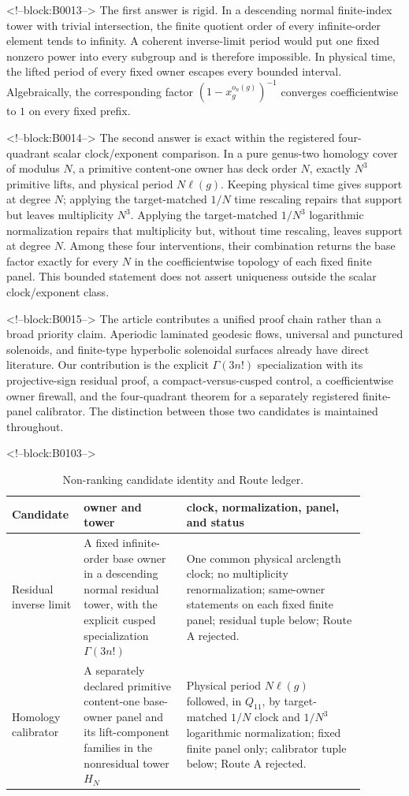 \documentclass[11pt]{article}
\theoremstyle{definition}
\theoremstyle{remark}
\begin{document}
<!--block:B0013-->
The first answer is rigid. In a descending normal finite-index tower with trivial intersection, the finite quotient order of every infinite-order element tends to infinity. A coherent inverse-limit period would put one fixed nonzero power into every subgroup and is therefore impossible. In physical time, the lifted period of every fixed owner escapes every bounded interval. Algebraically, the corresponding factor $(1-x_g^{o_n(g)})^{-1}$ converges coefficientwise to $1$ on every fixed prefix.

<!--block:B0014-->
The second answer is exact within the registered four-quadrant scalar clock/exponent comparison. In a pure genus-two homology cover of modulus $N$, a primitive content-one owner has deck order $N$, exactly $N^3$ primitive lifts, and physical period $N\ell(g)$. Keeping physical time gives support at degree $N$; applying the target-matched $1/N$ time rescaling repairs that support but leaves multiplicity $N^3$. Applying the target-matched $1/N^3$ logarithmic normalization repairs that multiplicity but, without time rescaling, leaves support at degree $N$. Among these four interventions, their combination returns the base factor exactly for every $N$ in the coefficientwise topology of each fixed finite panel. This bounded statement does not assert uniqueness outside the scalar clock/exponent class.

<!--block:B0015-->
The article contributes a unified proof chain rather than a broad priority claim. Aperiodic laminated geodesic flows, universal and punctured solenoids, and finite-type hyperbolic solenoidal surfaces already have direct literature. Our contribution is the explicit $\Gamma(3n!)$ specialization with its projective-sign residual proof, a compact-versus-cusped control, a coefficientwise owner firewall, and the four-quadrant theorem for a separately registered finite-panel calibrator. The distinction between those two candidates is maintained throughout.

<!--block:B0103-->
\begin{table}[ht]
\centering
\small
\caption{Non-ranking candidate identity and Route ledger.}
\label{tab:candidate-route-map}
\begin{tabular}{p{0.15\linewidth}p{0.27\linewidth}p{0.47\linewidth}}
\toprule
Candidate & owner and tower & clock, normalization, panel, and status \\
\midrule
Residual inverse limit & A fixed infinite-order base owner in a descending normal residual tower, with the explicit cusped specialization $\Gamma(3n!)$ & One common physical arclength clock; no multiplicity renormalization; same-owner statements on each fixed finite panel; residual tuple below; Route A rejected. \\
Homology calibrator & A separately declared primitive content-one base-owner panel and its lift-component families in the nonresidual tower $H_N$ & Physical period $N\ell(g)$ followed, in $Q_{11}$, by target-matched $1/N$ clock and $1/N^3$ logarithmic normalization; fixed finite panel only; calibrator tuple below; Route A rejected. \\
\bottomrule
\end{tabular}
\end{table}
\end{document}
